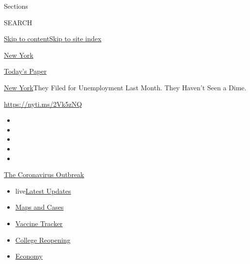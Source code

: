 Sections

SEARCH

\protect\hyperlink{site-content}{Skip to
content}\protect\hyperlink{site-index}{Skip to site index}

\href{https://www.nytimes3xbfgragh.onion/section/nyregion}{New York}

\href{https://myaccount.nytimes3xbfgragh.onion/auth/login?response_type=cookie\&client_id=vi}{}

\href{https://www.nytimes3xbfgragh.onion/section/todayspaper}{Today's
Paper}

\href{/section/nyregion}{New York}\textbar{}They Filed for Unemployment
Last Month. They Haven't Seen a Dime.

\url{https://nyti.ms/2Vk5zNQ}

\begin{itemize}
\item
\item
\item
\item
\item
\end{itemize}

\href{https://www.nytimes3xbfgragh.onion/news-event/coronavirus?action=click\&pgtype=Article\&state=default\&region=TOP_BANNER\&context=storylines_menu}{The
Coronavirus Outbreak}

\begin{itemize}
\tightlist
\item
  live\href{https://www.nytimes3xbfgragh.onion/2020/08/04/world/coronavirus-cases.html?action=click\&pgtype=Article\&state=default\&region=TOP_BANNER\&context=storylines_menu}{Latest
  Updates}
\item
  \href{https://www.nytimes3xbfgragh.onion/interactive/2020/us/coronavirus-us-cases.html?action=click\&pgtype=Article\&state=default\&region=TOP_BANNER\&context=storylines_menu}{Maps
  and Cases}
\item
  \href{https://www.nytimes3xbfgragh.onion/interactive/2020/science/coronavirus-vaccine-tracker.html?action=click\&pgtype=Article\&state=default\&region=TOP_BANNER\&context=storylines_menu}{Vaccine
  Tracker}
\item
  \href{https://www.nytimes3xbfgragh.onion/2020/08/02/us/covid-college-reopening.html?action=click\&pgtype=Article\&state=default\&region=TOP_BANNER\&context=storylines_menu}{College
  Reopening}
\item
  \href{https://www.nytimes3xbfgragh.onion/live/2020/08/04/business/stock-market-today-coronavirus?action=click\&pgtype=Article\&state=default\&region=TOP_BANNER\&context=storylines_menu}{Economy}
\end{itemize}

